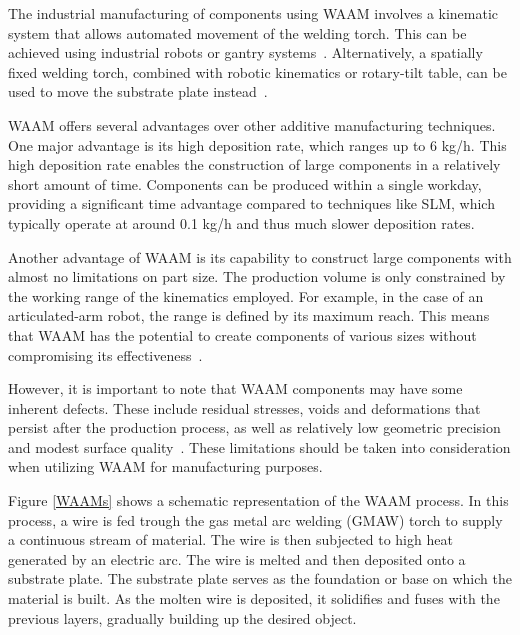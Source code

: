 The industrial manufacturing of components using \acrshort{WAAM} involves a kinematic system that allows automated movement of the welding torch. This can be achieved using industrial robots or gantry systems~\cite{Schmitz.2021}. Alternatively, a spatially fixed welding torch, combined with robotic kinematics or rotary-tilt table, can be used to move the substrate plate instead~\cite{Nagasai.2022}. %


\acrshort{WAAM} offers several advantages over other additive manufacturing techniques. One major advantage is its high deposition rate, which ranges up to 6 kg/h. This high deposition rate enables the construction of large components in a relatively short amount of time. Components can be produced within a single workday, providing a significant time advantage compared to techniques like SLM, which typically operate at around 0.1 kg/h and thus much slower deposition rates. \cite{IvanTabernero.2018} 

Another advantage of \acrshort{WAAM} is its capability to construct large components with almost no limitations on part size. The production volume is only constrained by the working range of the kinematics employed. For example, in the case of an articulated-arm robot, the range is defined by its maximum reach. This means that \acrshort{WAAM} has the potential to create components of various sizes without compromising its effectiveness~\cite{Li.2019}.

However, it is important to note that \acrshort{WAAM} components may have some inherent defects. These include residual stresses, voids and deformations that persist after the production process, as well as relatively low geometric precision and modest surface quality~\cite{Wu.2018}. These limitations should be taken into consideration when utilizing \acrshort{WAAM} for manufacturing purposes.

Figure \ref{WAAMs} shows a schematic representation of the \acrshort{WAAM} process. In this process, a wire is fed trough the gas metal arc welding (\acrshort{GMAW}) torch to supply a continuous stream of material. The wire is then subjected to high heat generated by an electric arc. The wire is melted and then deposited onto a substrate plate. The substrate plate serves as the foundation or base on which the material is built. As the molten wire is deposited, it solidifies and fuses with the previous layers, gradually building up the desired object.

